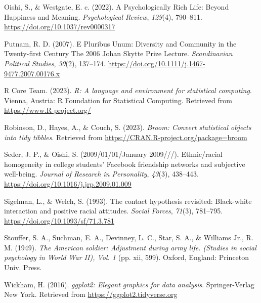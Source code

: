 \documentclass[
  man]{apa6}
\newlength{\cslhangindent}
\newlength{\cslentryspacingunit} %
\newenvironment{CSLReferences}[2] %
 {%
  \setlength{\parindent}{0pt}
  \ifodd #1
  \let\oldpar\par
  \def\par{\hangindent=\cslhangindent\oldpar}
  \fi
  \setlength{\parskip}{#2\cslentryspacingunit}
 }%
 {}
\begin{document}
\begin{CSLReferences}{1}{0}
\leavevmode{}%
Oishi, S., \& Westgate, E. c. (2022). A {Psychologically Rich Life}: {Beyond Happiness} and {Meaning}. \emph{Psychological Review}, \emph{129}(4), 790--811. \url{https://doi.org/10.1037/rev0000317}

\leavevmode{}%
Putnam, R. D. (2007). E {Pluribus Unum}: {Diversity} and {Community} in the {Twenty-first Century The} 2006 {Johan Skytte Prize Lecture}. \emph{Scandinavian Political Studies}, \emph{30}(2), 137--174. \url{https://doi.org/10.1111/j.1467-9477.2007.00176.x}

\leavevmode{}%
R Core Team. (2023). \emph{R: A language and environment for statistical computing}. Vienna, Austria: R Foundation for Statistical Computing. Retrieved from \url{https://www.R-project.org/}

\leavevmode{}%
Robinson, D., Hayes, A., \& Couch, S. (2023). \emph{Broom: Convert statistical objects into tidy tibbles}. Retrieved from \url{https://CRAN.R-project.org/package=broom}

\leavevmode{}%
Seder, J. P., \& Oishi, S. (2009/01/01/January 2009///). Ethnic/racial homogeneity in college students' {Facebook} friendship networks and subjective well-being. \emph{Journal of Research in Personality}, \emph{43}(3), 438--443. \url{https://doi.org/10.1016/j.jrp.2009.01.009}

\leavevmode{}%
Sigelman, L., \& Welch, S. (1993). The contact hypothesis revisited: Black-white interaction and positive racial attitudes. \emph{Social Forces}, \emph{71}(3), 781--795. \url{https://doi.org/10.1093/sf/71.3.781}

\leavevmode{}%
Stouffer, S. A., Suchman, E. A., Devinney, L. C., Star, S. A., \& Williams Jr., R. M. (1949). \emph{The {American} soldier: {Adjustment} during army life. ({Studies} in social psychology in {World War II}), {Vol}. 1} (pp. xii, 599). {Oxford, England}: {Princeton Univ. Press}.

\leavevmode{}%
Wickham, H. (2016). \emph{ggplot2: Elegant graphics for data analysis}. Springer-Verlag New York. Retrieved from \url{https://ggplot2.tidyverse.org}


\end{CSLReferences}
\end{document}
